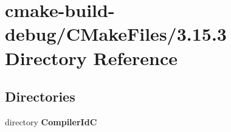 \section{cmake-\/build-\/debug/\+C\+Make\+Files/3.15.3 Directory Reference}
\label{dir_f942a7a73394fda25d4213a70555b3f8}
\subsection*{Directories}
\begin{DoxyCompactItemize}
\item 
directory {\bf Compiler\+IdC}
\end{DoxyCompactItemize}
